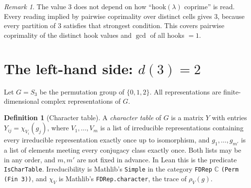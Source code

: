 \documentclass[11pt]{article}
\renewcommand{\_}{\oldus\allowbreak}
\theoremstyle{definition}
\newtheorem{definition}[theorem]{Definition}
\theoremstyle{remark}
\newtheorem{remark}[theorem]{Remark}
\begin{document}
\begin{remark}
The value $3$ does not depend on how ``hook$(\lambda)$ coprime'' is read. Every reading implied by pairwise
coprimality over distinct cells gives $3$, because every partition of $3$ satisfies that strongest
condition. This covers pairwise coprimality of the distinct hook values and $\gcd$ of all hooks $=1$.
\end{remark}

\section{The left-hand side: $d(3)=2$}

Let $G=S_3$ be the permutation group of $\{0,1,2\}$. All representations are finite-dimensional
complex representations of $G$.

\begin{definition}[Character table]\label{def:ct}
A \emph{character table} of $G$ is a matrix $Y$ with entries $Y_{ij}=\chi_{V_i}(g_j)$, where
$V_1,\dots,V_m$ is a list of irreducible representations containing every irreducible
representation exactly once up to isomorphism, and $g_1,\dots,g_{m'}$ is a list of elements meeting
every conjugacy class exactly once. Both lists may be in any order, and $m,m'$ are not fixed in
advance. In Lean this is the predicate \texttt{IsCharTable}. Irreducibility is Mathlib's
\texttt{Simple} in the category \texttt{FDRep} $\mathbb C$ \texttt{(Perm (Fin 3))}, and $\chi_V$ is Mathlib's
\texttt{FDRep.character}, the trace of $\rho_V(g)$.
\end{definition}
\end{document}
